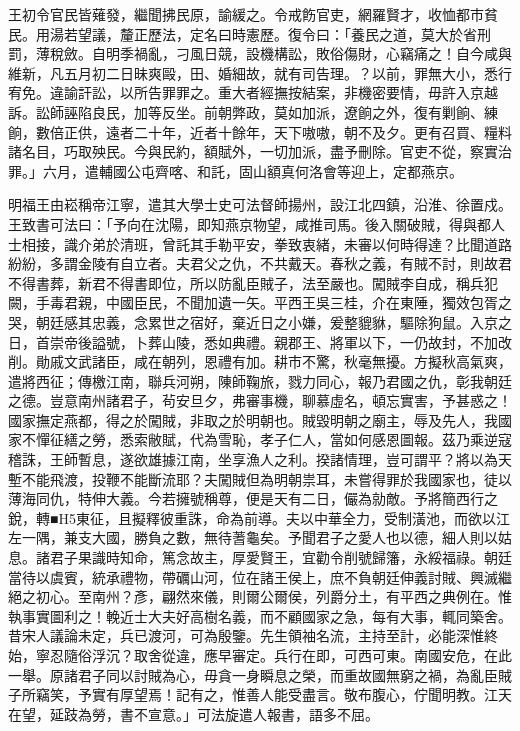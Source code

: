 \begin{pinyinscope}
王初令官民皆薙發，繼聞拂民原，諭緩之。令戒飭官吏，網羅賢才，收恤都市貧民。用湯若望議，釐正歷法，定名曰時憲歷。復令曰：「養民之道，莫大於省刑罰，薄稅斂。自明季禍亂，刁風日競，設機構訟，敗俗傷財，心竊痛之！自今咸與維新，凡五月初二日昧爽毆，田、婚細故，就有司告理。？以前，罪無大小，悉行宥免。違諭訐訟，以所告罪罪之。重大者經撫按結案，非機密要情，毋許入京越訴。訟師誣陷良民，加等反坐。前朝弊政，莫如加派，遼餉之外，復有剿餉、練餉，數倍正供，遠者二十年，近者十餘年，天下嗷嗷，朝不及夕。更有召買、糧料諸名目，巧取殃民。今與民約，額賦外，一切加派，盡予刪除。官吏不從，察實治罪。」六月，遣輔國公屯齊喀、和託，固山額真何洛會等迎上，定都燕京。

明福王由崧稱帝江寧，遣其大學士史可法督師揚州，設江北四鎮，沿淮、徐置戍。王致書可法曰：「予向在沈陽，即知燕京物望，咸推司馬。後入關破賊，得與都人士相接，識介弟於清班，曾託其手勒平安，拳致衷緒，未審以何時得達？比聞道路紛紛，多謂金陵有自立者。夫君父之仇，不共戴天。春秋之義，有賊不討，則故君不得書葬，新君不得書即位，所以防亂臣賊子，法至嚴也。闖賊李自成，稱兵犯闕，手毒君親，中國臣民，不聞加遺一矢。平西王吳三桂，介在東陲，獨效包胥之哭，朝廷感其忠義，念累世之宿好，棄近日之小嫌，爰整貔貅，驅除狗鼠。入京之日，首崇帝後謚號，卜葬山陵，悉如典禮。親郡王、將軍以下，一仍故封，不加改削。勛戚文武諸臣，咸在朝列，恩禮有加。耕市不驚，秋毫無擾。方擬秋高氣爽，遣將西征；傳檄江南，聯兵河朔，陳師鞠旅，戮力同心，報乃君國之仇，彰我朝廷之德。豈意南州諸君子，茍安旦夕，弗審事機，聊慕虛名，頓忘實害，予甚惑之！國家撫定燕都，得之於闖賊，非取之於明朝也。賊毀明朝之廟主，辱及先人，我國家不憚征繕之勞，悉索敝賦，代為雪恥，孝子仁人，當如何感恩圖報。茲乃乘逆寇稽誅，王師暫息，遂欲雄據江南，坐享漁人之利。揆諸情理，豈可謂平？將以為天塹不能飛渡，投鞭不能斷流耶？夫闖賊但為明朝祟耳，未嘗得罪於我國家也，徒以薄海同仇，特伸大義。今若擁號稱尊，便是天有二日，儼為勍敵。予將簡西行之銳，轉■H5東征，且擬釋彼重誅，命為前導。夫以中華全力，受制潢池，而欲以江左一隅，兼支大國，勝負之數，無待蓍龜矣。予聞君子之愛人也以德，細人則以姑息。諸君子果識時知命，篤念故主，厚愛賢王，宜勸令削號歸籓，永綏福祿。朝廷當待以虞賓，統承禮物，帶礪山河，位在諸王侯上，庶不負朝廷伸義討賊、興滅繼絕之初心。至南州？彥，翩然來儀，則爾公爾侯，列爵分土，有平西之典例在。惟執事實圖利之！輓近士大夫好高樹名義，而不顧國家之急，每有大事，輒同築舍。昔宋人議論未定，兵已渡河，可為殷鑒。先生領袖名流，主持至計，必能深惟終始，寧忍隨俗浮沉？取舍從違，應早審定。兵行在即，可西可東。南國安危，在此一舉。原諸君子同以討賊為心，毋貪一身瞬息之榮，而重故國無窮之禍，為亂臣賊子所竊笑，予實有厚望焉！記有之，惟善人能受盡言。敬布腹心，佇聞明教。江天在望，延跂為勞，書不宣意。」可法旋遣人報書，語多不屈。


\end{pinyinscope}
